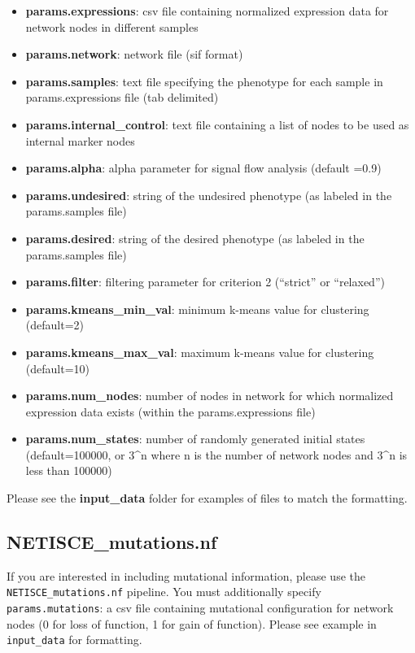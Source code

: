 \documentclass[
]{book}
\providecommand{\tightlist}{%
  \setlength{\itemsep}{0pt}\setlength{\parskip}{0pt}}
\theoremstyle{definition}
\theoremstyle{definition}
\theoremstyle{definition}
\theoremstyle{definition}
\theoremstyle{remark}
\begin{document}
\begin{itemize}
\tightlist
\item
  \textbf{params.expressions}: csv file containing normalized expression data for network nodes in different samples
\item
  \textbf{params.network}: network file (sif format)
\item
  \textbf{params.samples}: text file specifying the phenotype for each sample in params.expressions file (tab delimited)
\item
  \textbf{params.internal\_control}: text file containing a list of nodes to be used as internal marker nodes
\item
  \textbf{params.alpha}: alpha parameter for signal flow analysis (default =0.9)
\item
  \textbf{params.undesired}: string of the undesired phenotype (as labeled in the params.samples file)
\item
  \textbf{params.desired}: string of the desired phenotype (as labeled in the params.samples file)
\item
  \textbf{params.filter}: filtering parameter for criterion 2 (``strict'' or ``relaxed'')
\item
  \textbf{params.kmeans\_min\_val}: minimum k-means value for clustering (default=2)
\item
  \textbf{params.kmeans\_max\_val}: maximum k-means value for clustering (default=10)
\item
  \textbf{params.num\_nodes}: number of nodes in network for which normalized expression data exists (within the params.expressions file)
\item
  \textbf{params.num\_states}: number of randomly generated initial states (default=100000, or 3\^{}n where n is the number of network nodes and 3\^{}n is less than 100000)
\end{itemize}

Please see the \textbf{input\_data} folder for examples of files to match the formatting.

\hypertarget{netisce_mutations.nf}{%
\subsection{NETISCE\_mutations.nf}\label{netisce_mutations.nf}}

If you are interested in including mutational information, please use the \texttt{NETISCE\_mutations.nf} pipeline. You must additionally specify \texttt{params.mutations}: a csv file containing mutational configuration for network nodes (0 for loss of function, 1 for gain of function). Please see example in \texttt{input\_data} for formatting.
\end{document}

